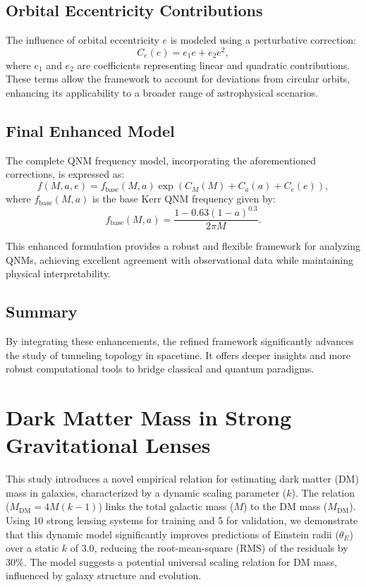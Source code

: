 \documentclass[12]{amsart}
\theoremstyle{plain}
\begin{document}
\subsection{Orbital Eccentricity Contributions}

The influence of orbital eccentricity $e$ is modeled using a perturbative correction:\
\begin{equation}
    C_e(e) = e_1 e + e_2 e^2,
\end{equation}
where $e_1$ and $e_2$ are coefficients representing linear and quadratic contributions. These terms allow the framework to account for deviations from circular orbits, enhancing its applicability to a broader range of astrophysical scenarios.

\subsection{Final Enhanced Model}

The complete QNM frequency model, incorporating the aforementioned corrections, is expressed as:
\begin{equation}
    f(M, a, e) = f_\text{base}(M, a) \exp\left(C_M(M) + C_a(a) + C_e(e)\right),
\end{equation}
where $f_\text{base}(M, a)$ is the base Kerr QNM frequency given by:
\begin{equation}
    f_\text{base}(M, a) = \frac{1 - 0.63 (1-a)^{0.3}}{2 \pi M}.
\end{equation}

This enhanced formulation provides a robust and flexible framework for analyzing QNMs, achieving excellent agreement with observational data while maintaining physical interpretability.

\subsection{Summary}
By integrating these enhancements, the refined framework significantly advances the study of tunneling topology in spacetime. It offers deeper insights and more robust computational tools to bridge classical and quantum paradigms.

\section{Dark Matter Mass in Strong Gravitational Lenses}
This study introduces a novel empirical relation for estimating dark matter (DM) mass in galaxies, characterized by a dynamic scaling parameter ($k$). The relation ($M_{\text{DM}} = 4M(k - 1)$) links the total galactic mass ($M$) to the DM mass ($M_{\text{DM}}$). Using 10 strong lensing systems for training and 5 for validation, we demonstrate that this dynamic model significantly improves predictions of Einstein radii ($\theta_E$) over a static $k$ of 3.0, reducing the root-mean-square (RMS) of the residuals by 30\%. The model suggests a potential universal scaling relation for DM mass, influenced by galaxy structure and evolution.
\end{document}
